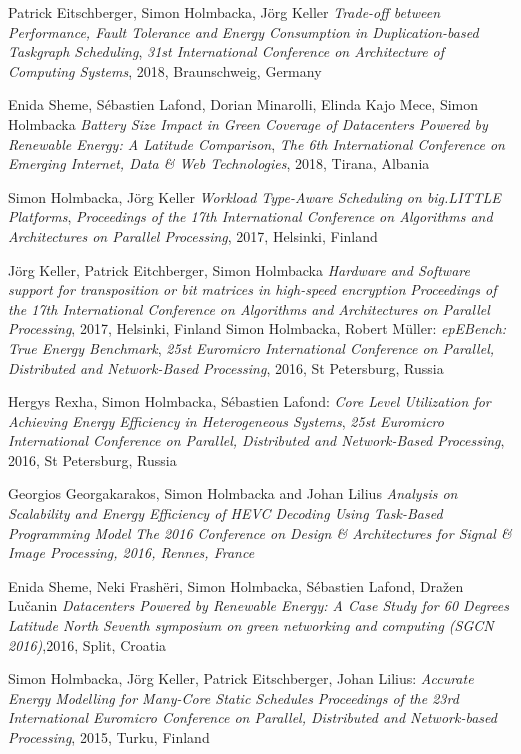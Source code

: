 \documentclass[margin,line]{resume}
\begin{document}
\begin{resume}
Patrick Eitschberger, Simon Holmbacka, J\"{o}rg Keller
\textit{Trade-off between Performance, Fault Tolerance and Energy Consumption in Duplication-based Taskgraph Scheduling},
\textsl{31st International Conference on Architecture of Computing Systems}, 2018, Braunschweig, Germany

Enida Sheme, S\'{e}bastien Lafond, Dorian Minarolli, Elinda Kajo Mece, Simon Holmbacka
\textit{Battery Size Impact in Green Coverage of Datacenters Powered by Renewable Energy: A Latitude Comparison},
\textsl{The 6th International Conference on Emerging Internet, Data \& Web Technologies}, 2018, Tirana, Albania

Simon Holmbacka, J\"{o}rg Keller
\textit{Workload Type-Aware Scheduling on big.LITTLE Platforms},
\textsl{Proceedings of the 17th International Conference on Algorithms and Architectures on Parallel Processing}, 2017, Helsinki, Finland

J\"{o}rg Keller, Patrick Eitchberger, Simon Holmbacka
\textit{Hardware and Software support for transposition or bit matrices in high-speed encryption}
\textsl{Proceedings of the 17th International Conference on Algorithms and Architectures on Parallel Processing}, 2017, Helsinki, Finland
\clearpage
Simon Holmbacka, Robert M\"{u}ller: 
\textit{epEBench: True Energy Benchmark},
\textsl{25st Euromicro International Conference on Parallel, Distributed and Network-Based Processing}, 2016, St Petersburg, Russia

Hergys Rexha, Simon Holmbacka, S\'{e}bastien Lafond: 
\textit{Core Level Utilization for Achieving Energy Efficiency in Heterogeneous Systems},
\textsl{25st Euromicro International Conference on Parallel, Distributed and Network-Based Processing}, 2016, St Petersburg, Russia

Georgios Georgakarakos, Simon Holmbacka and Johan Lilius
\textit{Analysis on Scalability and Energy Efficiency of HEVC Decoding Using Task-Based Programming Model}
\textsl{The 2016 Conference on Design \& Architectures for Signal \& Image Processing, 2016, Rennes, France}

Enida Sheme, Neki Frash\"{e}ri, Simon Holmbacka, S\'{e}bastien Lafond, Dra\v{z}en Lu\v{c}anin 
\textit{Datacenters Powered by Renewable Energy: A Case Study for 60 Degrees Latitude North}
\textsl{Seventh symposium on green networking and computing (SGCN 2016)},2016, Split, Croatia

Simon Holmbacka, J\"{o}rg Keller, Patrick Eitschberger, Johan Lilius:
\textit{Accurate Energy Modelling for Many-Core Static Schedules}
\textsl{Proceedings of the 23rd International Euromicro Conference on Parallel, Distributed and Network-based Processing}, 2015, Turku, Finland


\end{resume}
\end{document}

